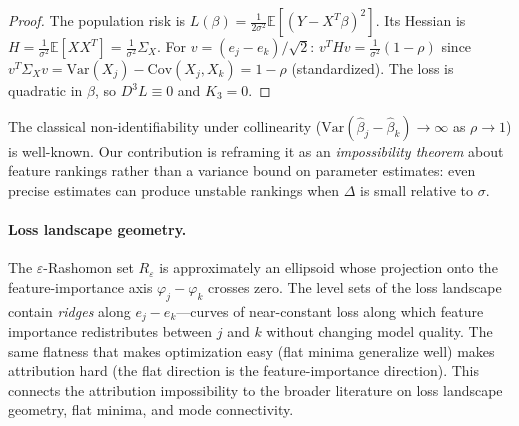 \documentclass{article}
\newcommand{\E}{\mathbb{E}}
\newcommand{\Var}{\mathrm{Var}}
\begin{document}
\begin{proof}
The population risk is $L(\beta) = \frac{1}{2\sigma^2}\E[(Y-X^T\beta)^2]$. Its Hessian is $H = \frac{1}{\sigma^2}\E[XX^T] = \frac{1}{\sigma^2}\Sigma_X$. For $v = (e_j - e_k)/\sqrt{2}$: $v^T H v = \frac{1}{\sigma^2}(1-\rho)$ since $v^T \Sigma_X v = \Var(X_j) - \text{Cov}(X_j,X_k) = 1-\rho$ (standardized). The loss is quadratic in $\beta$, so $D^3 L \equiv 0$ and $K_3 = 0$.
\end{proof}

The classical non-identifiability under collinearity ($\Var(\hat\beta_j - \hat\beta_k) \to \infty$ as $\rho \to 1$) is well-known. Our contribution is reframing it as an \emph{impossibility theorem} about feature rankings rather than a variance bound on parameter estimates: even precise estimates can produce unstable rankings when $\Delta$ is small relative to $\sigma$.

\paragraph{Loss landscape geometry.}
The $\varepsilon$-Rashomon set $R_\varepsilon$ is approximately an ellipsoid whose projection onto the feature-importance axis $\varphi_j - \varphi_k$ crosses zero. The level sets of the loss landscape contain \emph{ridges} along $e_j - e_k$---curves of near-constant loss along which feature importance redistributes between $j$ and $k$ without changing model quality. The same flatness that makes optimization easy (flat minima generalize well) makes attribution hard (the flat direction is the feature-importance direction). This connects the attribution impossibility to the broader literature on loss landscape geometry, flat minima, and mode connectivity.
\end{document}
